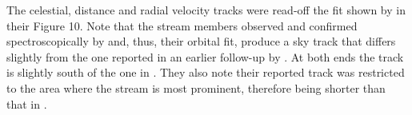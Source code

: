 The celestial, distance and radial velocity tracks were read-off the fit 
shown by \citet{Fu2018} in their Figure 10. Note that the stream members observed and confirmed spectroscopically by \citet{Fu2018} and, thus, their orbital fit, produce a sky track that differs slightly from the one reported in an earlier follow-up by \citet{Bernard2016}. At both ends the \citet{Bernard2016}  track is slightly south of the one in \citet{Fu2018}. 
They also note their reported track was restricted to the area where the stream is most prominent, 
therefore being shorter than that in \citet{Bernard2016}.
